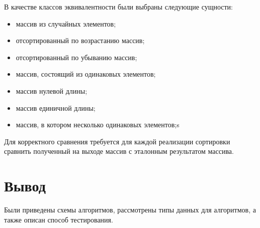 В качестве классов эквивалентности были выбраны следующие сущности:
\begin{itemize}
	\item массив из случайных элементов;
	\item отсортированный по возрастанию массив;
	\item отсортированный по убыванию массив;
	\item массив, состоящий из одинаковых элементов;
	\item массив нулевой длины;
	\item массив единичной длины;
	\item массив, в котором несколько одинаковых элементов;s
\end{itemize}

Для корректного сравнения требуется для каждой реализации сортировки
сравнить полученный на выходе массив с эталонным результатом массива.

\section{Вывод}
Были приведены схемы алгоритмов, рассмотрены типы данных
для алгоритмов, а также описан способ тестирования.